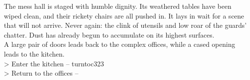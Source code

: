 The mess hall is staged with humble dignity. Its weathered tables have been wiped clean, and their rickety chairs are all pushed in. It lays in wait for a scene that will not arrive. Never again: the clink of utensils and low roar of the guards' chatter. Dust has already begun to accumulate on its highest surfaces.\\

A large pair of doors leads back to the complex offices, while a cased opening leads to the kitchen.\\

> Enter the kitchen -- turnto{c323}\\
> Return to the offices -- 